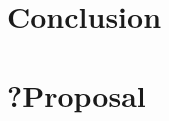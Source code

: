 \documentclass[18pt]{article}
\numberwithin{equation}{section} %
\numberwithin{figure}{section} %
\numberwithin{table}{section} %
\begin{document}
	
\section{Conclusion}	
\section{?Proposal}	
	
	

\newpage
\begin{flushleft}



\end{flushleft}
\end{document}
